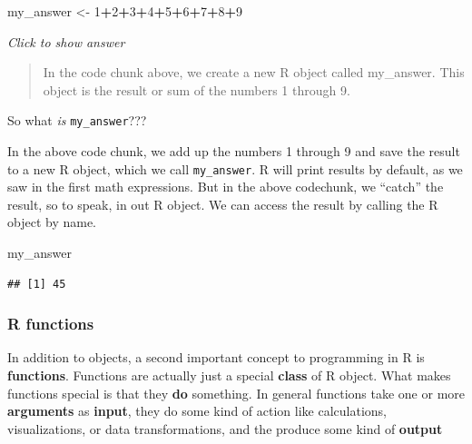 \documentclass[
]{book}
\newenvironment{Shaded}{\begin{snugshade}}{\end{snugshade}}
\newcommand{\DecValTok}[1]{\textcolor[rgb]{0.00,0.00,0.81}{#1}}
\newcommand{\NormalTok}[1]{#1}
\newcommand{\OtherTok}[1]{\textcolor[rgb]{0.56,0.35,0.01}{#1}}
\newcommand{\SpecialCharTok}[1]{\textcolor[rgb]{0.81,0.36,0.00}{\textbf{#1}}}
\begin{document}
\begin{Shaded}
\begin{Highlighting}[]
\NormalTok{my\_answer }\OtherTok{\textless{}{-}} \DecValTok{1}\SpecialCharTok{+}\DecValTok{2}\SpecialCharTok{+}\DecValTok{3}\SpecialCharTok{+}\DecValTok{4}\SpecialCharTok{+}\DecValTok{5}\SpecialCharTok{+}\DecValTok{6}\SpecialCharTok{+}\DecValTok{7}\SpecialCharTok{+}\DecValTok{8}\SpecialCharTok{+}\DecValTok{9}
\end{Highlighting}
\end{Shaded}

\emph{Click to show answer}

\begin{quote}
In the code chunk above, we create a new R object called my\_answer. This
object is the result or sum of the numbers 1 through 9.
\end{quote}

So what \emph{is} \texttt{my\_answer}???

In the above code chunk, we add up the numbers 1 through 9 and save the result to a new R object, which we call \texttt{my\_answer}. R will print results by default, as we saw in the first math expressions. But in the above codechunk, we ``catch'' the result, so to speak, in out R object. We can access the result by calling the R object by name.

\begin{Shaded}
\begin{Highlighting}[]
\NormalTok{my\_answer}
\end{Highlighting}
\end{Shaded}

\begin{verbatim}
## [1] 45
\end{verbatim}

\hypertarget{r-functions}{%
\subsubsection*{R functions}\label{r-functions}}

In addition to objects, a second important concept to programming in R is \textbf{functions}. Functions are actually just a special \textbf{class} of R object. What makes functions special is that they \textbf{do} something. In general functions take one or more \textbf{arguments} as \textbf{input}, they do some kind of action like calculations, visualizations, or data transformations, and the produce some kind of \textbf{output}
\end{document}
